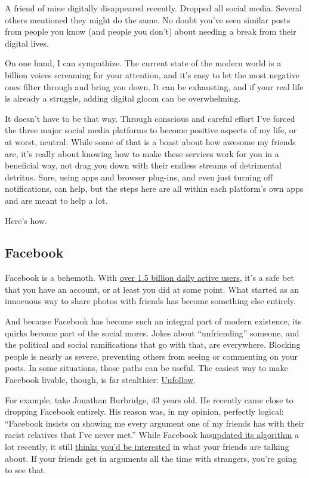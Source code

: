 A friend of mine digitally disappeared recently. Dropped all social
media. Several others mentioned they might do the same. No doubt you've
seen similar posts from people you know (and people you don't) about
needing a break from their digital lives.

On one hand, I can sympathize. The current state of the modern world is
a billion voices screaming for your attention, and it's easy to let the
most negative ones filter through and bring you down. It can be
exhausting, and if your real life is already a struggle, adding digital
gloom can be overwhelming.

It doesn't have to be that way. Through conscious and careful effort
I've forced the three major social media platforms to become positive
aspects of my life, or at worst, neutral. While some of that is a boast
about how awesome my friends are, it's really about knowing how to make
these services work for you in a beneficial way, not drag you down with
their endless streams of detrimental detritus. Sure, using apps and
browser plug-ins, and even just turning off notifications, can help, but
the steps here are all within each platform's own apps and are meant to
help a lot.

Here's how.

\hypertarget{facebook}{%
\subsection{Facebook}\label{facebook}}

Facebook is a behemoth. With
\href{https://www.statista.com/statistics/346167/facebook-global-dau/}{over
1.5 billion daily active users}, it's a safe bet that you have an
account, or at least you did at some point. What started as an innocuous
way to share photos with friends has become something else entirely.

And because Facebook has become such an integral part of modern
existence, its quirks become part of the social mores. Jokes about
``unfriending'' someone, and the political and social ramifications that
go with that, are everywhere. Blocking people is nearly as severe,
preventing others from seeing or commenting on your posts. In some
situations, those paths can be useful. The easiest way to make Facebook
livable, though, is far stealthier:
\href{https://www.facebookcorewwwi.onion/help/190078864497547}{Unfollow}.

For example, take Jonathan Burbridge, 43 years old. He recently came
close to dropping Facebook entirely. His reason was, in my opinion,
perfectly logical: ``Facebook insists on showing me every argument one
of my friends has with their racist relatives that I've never met.''
While Facebook
has\href{https://newsroom.fb.com/news/2019/05/more-personalized-experiences/}{updated
its algorithm} a lot recently, it still
\href{https://about.fb.com/news/2019/04/people-publishers-the-community/}{thinks
you'd be interested} in what your friends are talking about. If your
friends get in arguments all the time with strangers, you're going to
see that.

